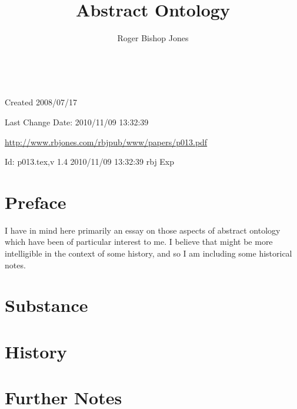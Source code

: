 \documentclass[numreferences]{book}
\title{Abstract Ontology}
\author{Roger Bishop Jones}
\date{\ }
\begin{document}
                                                    
\frontmatter
\begin{titlepage}
\maketitle


\vfill

\begin{centering}

\footnotesize{
Created 2008/07/17

Last Change $ $Date: 2010/11/09 13:32:39 $ $

\href{http://www.rbjones.com/rbjpub/www/papers/p013.pdf}{http://www.rbjones.com/rbjpub/www/papers/p013.pdf}

$ $Id: p013.tex,v 1.4 2010/11/09 13:32:39 rbj Exp $ $\\

}%
\end{centering}
\end{titlepage}

\newpage
\setcounter{tocdepth}{3}
{\parskip-0pt\tableofcontents}

\mainmatter

\chapter{Preface}

I have in mind here primarily an essay on those aspects of abstract ontology which have been of particular interest to me.
I believe that might be more intelligible in the context of some history, and so I am including some historical notes.

\chapter{Substance}



\chapter{History}



\chapter{Further Notes}



\backmatter
%
%

\label{index}
{\twocolumn[]
{\small\printindex}}
\end{document}
